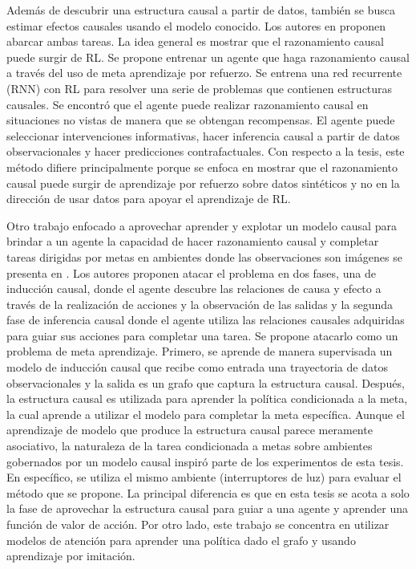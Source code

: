 Además de descubrir una estructura causal a partir de datos, también se busca estimar efectos causales usando el modelo conocido. Los autores en \cite{dasgupta2019causal} proponen abarcar ambas tareas.
La idea general es mostrar que el razonamiento causal puede surgir de RL.
Se propone entrenar un agente que haga razonamiento causal a través del uso de meta
aprendizaje por refuerzo. Se entrena una red recurrente (RNN) con RL para resolver
una serie de problemas que contienen estructuras causales. Se encontró que el agente
puede realizar razonamiento causal en situaciones no vistas de manera que se obtengan
recompensas. El agente puede seleccionar intervenciones informativas, hacer inferencia
causal a partir de datos observacionales y hacer predicciones contrafactuales. Con respecto a la tesis, este método difiere principalmente porque se enfoca en mostrar que el razonamiento causal puede surgir de aprendizaje por refuerzo sobre datos sintéticos y no en la dirección de usar datos para apoyar el aprendizaje de RL.


Otro trabajo enfocado a aprovechar aprender y explotar un modelo causal para brindar a un agente la capacidad de hacer razonamiento causal y completar tareas dirigidas por metas en ambientes donde las observaciones son imágenes se presenta en \cite{nair2019causal}. Los autores proponen atacar el problema en dos fases, una de inducción causal, donde el agente descubre las relaciones de causa y efecto a través de la realización de acciones y la observación de las salidas y la segunda fase de inferencia causal donde el agente utiliza las relaciones causales adquiridas para guiar sus acciones para completar una tarea. Se propone atacarlo como un problema de meta aprendizaje. Primero, se aprende de manera supervisada un modelo de inducción causal que recibe como entrada una trayectoria de datos observacionales y la salida es un grafo que captura la estructura causal. Después, la estructura causal es utilizada para aprender la política condicionada a la meta, la cual aprende a utilizar el modelo para completar la meta específica.	Aunque el aprendizaje de modelo que produce la estructura causal parece meramente asociativo, la naturaleza de la tarea condicionada a metas sobre ambientes gobernados por un modelo causal inspiró parte de los experimentos de esta tesis. En específico, se utiliza el mismo ambiente (interruptores de luz) para evaluar el método que se propone. La principal diferencia es que en esta tesis se acota a solo la fase de aprovechar la estructura causal para guiar a una agente y aprender una función de valor de acción. Por otro lado, este trabajo se concentra en utilizar modelos de atención para aprender una política dado el grafo y usando aprendizaje por imitación.


